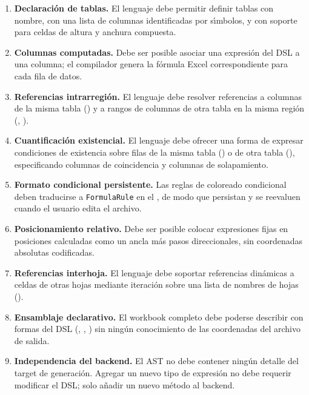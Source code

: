 \begin{enumerate}
  \item \textbf{Declaraci\'on de tablas.} El lenguaje debe permitir definir
    tablas con nombre, con una lista de columnas identificadas por s\'{\i}mbolos,
    y con soporte para celdas de altura y anchura compuesta.

  \item \textbf{Columnas computadas.} Debe ser posible asociar una expresi\'on
    del DSL a una columna; el compilador genera la f\'ormula Excel
    correspondiente para cada fila de datos.

  \item \textbf{Referencias intrarregi\'on.} El lenguaje debe resolver
    referencias a columnas de la misma tabla () y a rangos de
    columnas de otra tabla en la misma regi\'on (, ).

  \item \textbf{Cuantificaci\'on existencial.} El lenguaje debe ofrecer una
    forma de expresar condiciones de existencia sobre filas de la misma tabla
    () o de otra tabla (), especificando
    columnas de coincidencia y columnas de solapamiento.

  \item \textbf{Formato condicional persistente.} Las reglas de coloreado
    condicional deben traducirse a \texttt{FormulaRule} en el \xlsx{}, de
    modo que persistan y se reevaluen cuando el usuario edita el archivo.

  \item \textbf{Posicionamiento relativo.} Debe ser posible colocar
    expresiones fijas en posiciones calculadas como un ancla m\'as pasos
    direccionales, sin coordenadas absolutas codificadas.

  \item \textbf{Referencias interhoja.} El lenguaje debe soportar referencias
    din\'amicas a celdas de otras hojas mediante iteraci\'on sobre una lista
    de nombres de hojas ().

  \item \textbf{Ensamblaje declarativo.} El workbook completo debe poderse
    describir con formas del DSL (, , )
    sin ning\'un conocimiento de las coordenadas del archivo de salida.

  \item \textbf{Independencia del backend.} El AST no debe contener
    ning\'un detalle del target de generaci\'on.  Agregar un nuevo tipo de
    expresi\'on no debe requerir modificar el DSL; solo a\~nadir un nuevo
    m\'etodo al backend.
\end{enumerate}

